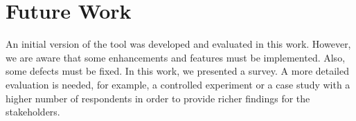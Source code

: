 \section{Future Work}
\label{sc:future-work}
An initial version of the tool was developed and evaluated in this work.
However, we are aware that some enhancements and features must be implemented.
Also, some defects must be fixed. 
In this work, we presented a survey. A more
detailed evaluation is needed, for example, a controlled experiment or a case
study with a higher number of respondents in order to provide richer findings for the stakeholders.

